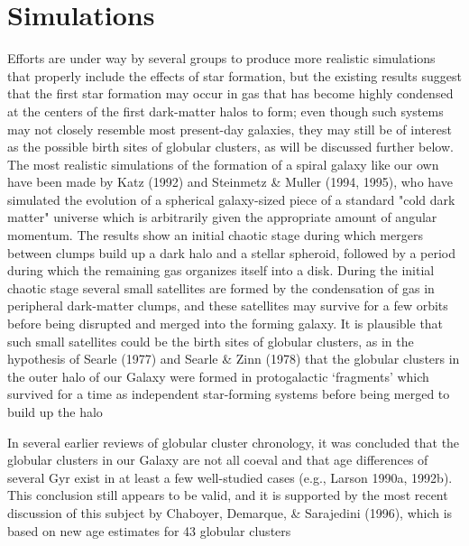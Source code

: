 \section{Simulations}

Efforts are under way by several groups to produce more realistic simulations that properly include the effects
of star formation, but the existing results suggest that the first star formation may occur in gas that has become highly condensed at the centers of the first dark-matter halos to form; even though such systems may not closely resemble most present-day galaxies, they may still be of interest as the possible birth sites
of globular clusters, as will be discussed further below. The most realistic simulations of the formation of a spiral galaxy like our own have been made by Katz (1992) and Steinmetz \& Muller (1994, 1995), who have simulated the evolution of a spherical galaxy-sized piece of a standard "cold dark matter" universe which is arbitrarily given the appropriate amount of angular momentum. The results show an initial chaotic stage during which mergers between clumps build up a dark halo and a stellar spheroid, followed by a period during which the remaining gas organizes itself into a disk. During the initial chaotic stage several small satellites are formed by the condensation of gas in peripheral dark-matter clumps, and these satellites may survive for a few
orbits before being disrupted and merged into the forming galaxy. It is plausible that such small satellites could be the birth sites of globular clusters, as in the hypothesis of Searle (1977) and Searle \& Zinn (1978) that the globular clusters in the outer halo of our Galaxy were formed in protogalactic ‘fragments’ which
survived for a time as independent star-forming systems before being merged to build up the halo

In several earlier reviews of globular cluster chronology, it was concluded that the globular clusters in our Galaxy are not all coeval and that age differences of several Gyr exist in at least a few well-studied cases (e.g., Larson 1990a, 1992b). This conclusion still appears to be valid, and it is supported by the most recent discussion of this subject by Chaboyer, Demarque, \& Sarajedini (1996), which is based on new age estimates for 43 globular clusters

